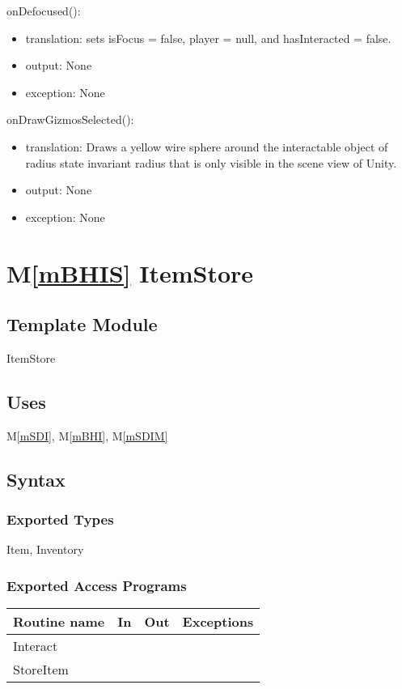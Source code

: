 \documentclass[12pt]{article}
\newcommand{\mref}[1]{M\ref{#1}}
\begin{document}
\noindent onDefocused():
\begin{itemize}
\item translation: sets isFocus = false, player = null, and hasInteracted = false.
\item output: None
\item exception: None
\end{itemize}

\noindent onDrawGizmosSelected():
\begin{itemize}
\item translation: Draws a yellow wire sphere around the interactable object of radius state invariant radius that is only visible in the scene view of Unity.
\item output: None
\item exception: None
\end{itemize}

\newpage

\section* {\mref{mBHIS} ItemStore}

\subsection*{Template Module}

ItemStore

\subsection* {Uses}

\mref{mSDI}, \mref{mBHI}, \mref{mSDIM}\\

\subsection* {Syntax}

\subsubsection* {Exported Types}

Item, Inventory

\subsubsection* {Exported Access Programs}

\begin{tabular}{| l | l | l | l |}
\hline
\textbf{Routine name} & \textbf{In} & \textbf{Out} & \textbf{Exceptions}\\
\hline
Interact & ~ & ~  & ~\\
StoreItem & ~ & ~ & ~\\
\hline
\end{tabular}
\end{document}
